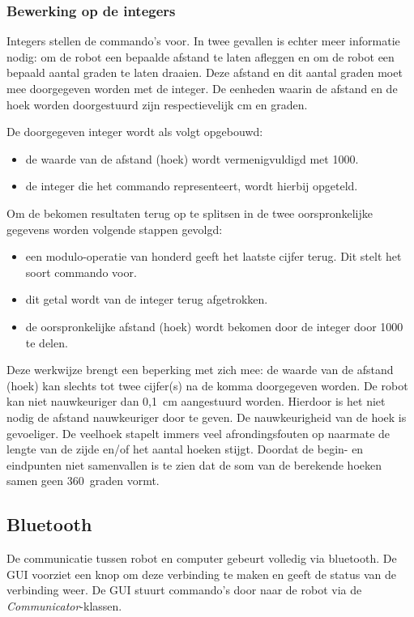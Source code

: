 \documentclass[eind]{penoverslag}
\begin{document}
\subsubsection{Bewerking op de integers} %
\label{sssec:integer}
Integers stellen de commando's voor. In twee gevallen is echter meer informatie nodig: om de robot een bepaalde afstand te laten afleggen en om de robot een bepaald aantal graden te laten draaien. Deze afstand en dit aantal graden moet mee doorgegeven worden met de integer. De eenheden waarin de afstand en de hoek worden doorgestuurd zijn respectievelijk cm en graden.

De doorgegeven integer wordt als volgt opgebouwd:

\begin{itemize}
\item de waarde van de afstand (hoek) wordt vermenigvuldigd met 1000.
\item de integer die het commando representeert, wordt hierbij opgeteld.
\end{itemize}

Om de bekomen resultaten terug op te splitsen in de twee oorspronkelijke gegevens worden volgende stappen gevolgd:

\begin{itemize}
\item een modulo-operatie van honderd geeft het laatste cijfer terug. Dit stelt het soort commando voor.
\item dit getal wordt van de integer terug afgetrokken.
\item de oorspronkelijke afstand (hoek) wordt bekomen door de integer door 1000 te delen.
\end{itemize}

Deze werkwijze brengt een beperking met zich mee: de waarde van de afstand (hoek) kan slechts tot twee cijfer(s) na de komma doorgegeven worden. De robot kan niet nauwkeuriger dan 0,1~cm aangestuurd worden. Hierdoor is het niet nodig de afstand nauwkeuriger door te geven. De nauwkeurigheid van de hoek is gevoeliger. De veelhoek stapelt immers veel afrondingsfouten op naarmate de lengte van de zijde en/of het aantal hoeken stijgt. Doordat de begin- en eindpunten niet samenvallen is te zien dat de som van de berekende hoeken samen geen 360~graden vormt. 

\subsection{Bluetooth} %
\label{ssec:bluetooth}
De communicatie tussen robot en computer gebeurt volledig via bluetooth. De GUI voorziet een knop om deze verbinding te maken en geeft de status van de verbinding weer. De GUI stuurt commando's door naar de robot via de \textit{Communicator}-klassen.\\
\end{document}
